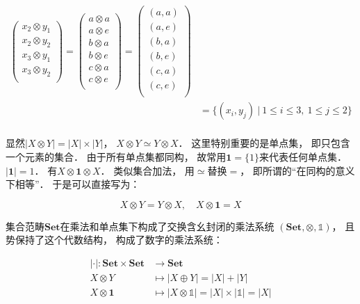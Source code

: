\documentclass[10pt, openany]{book}
\begin{document}
\begin{equation}
\begin{aligned}
\begin{pmatrix}
    x_2 \otimes y_1 \\x_2 \otimes y_2 \\
    x_3 \otimes y_1 \\x_3 \otimes y_2 \\\end{pmatrix}
=\begin{pmatrix}a \otimes a \\ a \otimes e \\
    b \otimes a \\ b \otimes e \\
    c \otimes a \\ c \otimes e \\\end{pmatrix} 
=\begin{pmatrix}(a,a) \\ (a,e) \\
    (b,a) \\ (b,e) \\
    (c,a) \\ (c,e) \\\end{pmatrix} \\
&= \{ (x_i,y_j) \ | \ 1 \leq i \leq 3,\ 1 \leq j \leq 2 \} \\
\end{aligned}
\end{equation}\label{eq:set-tensor}


显然$|X \otimes Y| = |X| \times |Y|$，
$X \otimes Y \simeq Y \otimes X$．
这里特别重要的是单点集，
即只包含一个元素的集合．
由于所有单点集都同构，
故常用$\mathbf{1} = \{1\}$来代表任何单点集．
$|\mathbf{1}| = 1$．
有$X \otimes \mathbf{1} \otimes X$．
类似集合加法，
用$\simeq$替换$=$，
即所谓的“在同构的意义下相等”．
于是可以直接写为：

$$X \otimes Y = Y \otimes X, \quad 
X \otimes \mathbf{1} = X$$

集合范畴$\mathbf{Set}$在乘法和单点集下构成了交换含幺封闭的乘法系统
$(\mathbf{Set},\otimes,\mathbb{1})$，
且势保持了这个代数结构，
构成了数字的乘法系统：

$$
\begin{aligned}
|\cdot|: \mathbf{Set} \times \mathbf{Set} &\to \mathbf{Set} \\
X \otimes Y &\mapsto |X \oplus Y| = |X| + |Y| \\
X \otimes \textbf{1} &\mapsto |X \otimes \mathbb{1}| = |X| \times |\mathbb{1}| = |X| \\
\end{aligned}
$$
\end{document}
